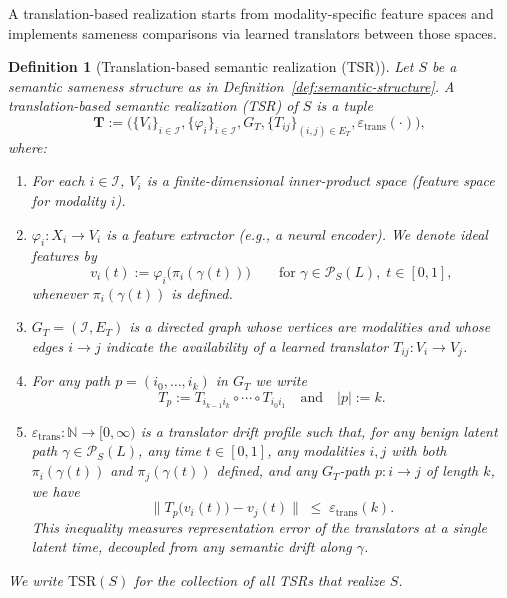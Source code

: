 \documentclass[11pt]{article}
\newcommand{\TSR}{\mathrm{TSR}}
\newtheorem{definition}{Definition}
\begin{document}
A translation-based realization starts from modality-specific feature spaces and implements
sameness comparisons via learned translators between those spaces.

\begin{definition}[Translation-based semantic realization (TSR)]
\label{def:tsr}
Let $S$ be a semantic sameness structure as in Definition~\ref{def:semantic-structure}.
A \emph{translation-based semantic realization} (TSR) of $S$ is a tuple
\[
\mathbf{T}
:=
\bigl(
\{V_i\}_{i\in\mathcal{I}},
\{\varphi_i\}_{i\in\mathcal{I}},
G_T,
\{T_{ij}\}_{(i,j)\in E_T},
\varepsilon_{\mathrm{trans}}(\cdot)
\bigr),
\]
where:
\begin{enumerate}[label=\textnormal{(\roman*)}, leftmargin=*]
\item For each $i\in\mathcal{I}$, $V_i$ is a finite-dimensional inner-product space
(feature space for modality $i$).

\item $\varphi_i : X_i\to V_i$ is a feature extractor (e.g., a neural encoder).
We denote ideal features by
\[
v_i(t) := \varphi_i\bigl(\pi_i(\gamma(t))\bigr)
\qquad
\text{for } \gamma\in\mathcal{P}_S(L),\; t\in[0,1],
\]
whenever $\pi_i(\gamma(t))$ is defined.

\item $G_T = (\mathcal{I}, E_T)$ is a directed graph whose vertices are modalities and whose
edges $i\to j$ indicate the availability of a learned \emph{translator}
$T_{ij} : V_i \to V_j$.

\item For any path $p = (i_0,\dots,i_k)$ in $G_T$ we write
\[
T_p := T_{i_{k-1} i_k} \circ \cdots \circ T_{i_0 i_1}
\quad\text{and}\quad |p|:=k.
\]

\item $\varepsilon_{\mathrm{trans}} : \mathbb{N} \to [0,\infty)$ is a \emph{translator drift profile}
such that, for any benign latent path $\gamma\in\mathcal{P}_S(L)$, any time $t\in[0,1]$,
any modalities $i,j$ with both $\pi_i(\gamma(t))$ and $\pi_j(\gamma(t))$ defined,
and any $G_T$-path $p: i\to j$ of length $k$, we have
\begin{equation}
\label{eq:tsr-drift}
\bigl\|
T_p\bigl( v_i(t) \bigr)
-
v_j(t)
\bigr\|
\;\le\;
\varepsilon_{\mathrm{trans}}(k).
\end{equation}
This inequality measures \emph{representation error} of the translators at a single latent
time, decoupled from any semantic drift along $\gamma$.
\end{enumerate}
We write $\TSR(S)$ for the collection of all TSRs that realize $S$.
\end{definition}
\end{document}
